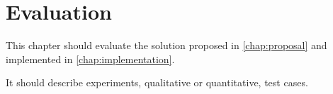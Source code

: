 \chapter{Evaluation}

This chapter should evaluate the solution proposed in \ref{chap:proposal} and implemented in \ref{chap:implementation}.

It should describe experiments, qualitative or quantitative, test cases.

